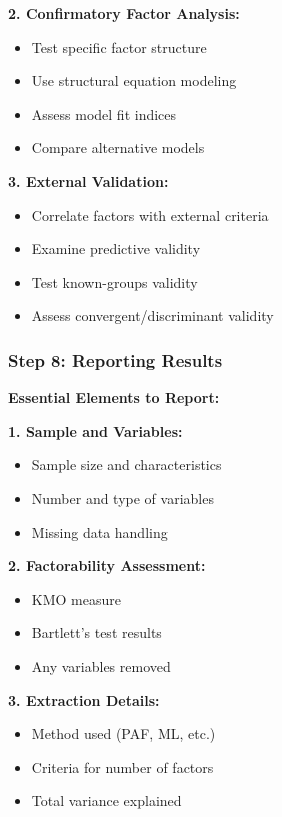 \documentclass[
]{article}
\begin{document}
\textbf{2. Confirmatory Factor Analysis:}

\begin{itemize}
\item
  Test specific factor structure
\item
  Use structural equation modeling
\item
  Assess model fit indices
\item
  Compare alternative models
\end{itemize}

\textbf{3. External Validation:}

\begin{itemize}
\item
  Correlate factors with external criteria
\item
  Examine predictive validity
\item
  Test known-groups validity
\item
  Assess convergent/discriminant validity
\end{itemize}

\subsubsection{Step 8: Reporting Results}

\textbf{Essential Elements to Report:}

\textbf{1. Sample and Variables:}

\begin{itemize}
\item
  Sample size and characteristics
\item
  Number and type of variables
\item
  Missing data handling
\end{itemize}

\textbf{2. Factorability Assessment:}

\begin{itemize}
\item
  KMO measure
\item
  Bartlett's test results
\item
  Any variables removed
\end{itemize}

\textbf{3. Extraction Details:}

\begin{itemize}
\item
  Method used (PAF, ML, etc.)
\item
  Criteria for number of factors
\item
  Total variance explained
\end{itemize}
\end{document}
